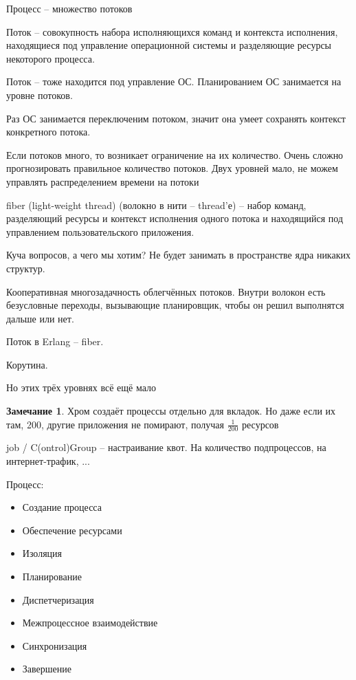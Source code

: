 \documentclass{book}
\theoremstyle{definition}
\newtheorem*{note}{Замечание}
\begin{document}
\begin{definition}
    Процесс -- множество потоков

    Поток -- совокупность набора исполняющихся команд и контекста исполнения, находящиеся под управление операционной системы и разделяющие ресурсы некоторого процесса.

    Поток -- тоже находится под управление ОС. Планированием ОС занимается на уровне потоков.

    Раз ОС занимается переключеним потоком, значит она умеет  сохранять контекст конкретного потока.

    Если потоков много, то возникает ограничение на их количество. Очень сложно прогнозировать правильное количество потоков. Двух уровней мало, не можем управлять распределением времени на потоки
\end{definition}

\begin{definition}
    fiber (light-weight thread) (волокно в нити -- thread'е) -- набор команд, разделяющий ресурсы и контекст исполнения одного потока и находящийся под управлением пользовательского приложения.

    Куча вопросов, а чего мы хотим? Не будет занимать в пространстве ядра никаких структур.

    Кооперативная многозадачность облегчённых потоков. Внутри волокон есть безусловные переходы, вызывающие планировщик, чтобы он решил выполнятся дальше или нет.

    Поток в Erlang -- fiber.

    Корутина.
\end{definition}

Но этих трёх уровнях всё ещё мало

\begin{note}
    Хром создаёт процессы отдельно для вкладок. Но даже если их там, 200, другие приложения не помирают, получая $\frac{1}{200}$ ресурсов
\end{note}

\begin{definition}
    job / C(ontrol)Group -- настраивание квот. На количество подпроцессов, на интернет-трафик, ...
\end{definition}

Процесс:
\begin{itemize}
    \item  Создание процесса
    \item Обеспечение ресурсами
    \item Изоляция
    \item Планирование
    \item Диспетчеризация
    \item Межпроцессное взаимодействие
    \item Синхронизация
    \item Завершение
\end{itemize}
\end{document}
